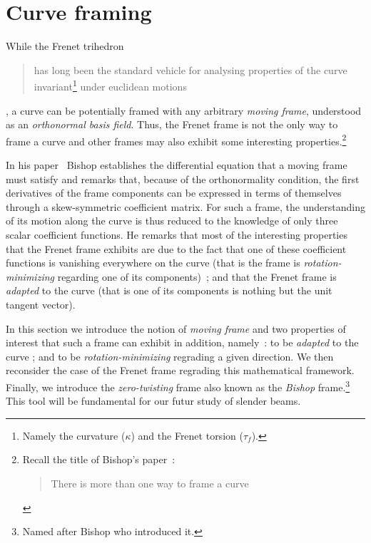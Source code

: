 
\section{Curve framing}\label{sec:curve_framing}


While the Frenet trihedron \blockcquote[p.1]{Bishop1975}{has long been the standard vehicle for analysing properties of the curve invariant\footnote{Namely the curvature ($\kappa$) and the Frenet torsion ($\tau_f$).} under euclidean motions}, a curve can be potentially framed with any arbitrary \emph{moving frame}, understood as an \emph{orthonormal basis field}. Thus, the Frenet frame is not the only way to frame a curve and other frames may also exhibit some interesting properties.\footnote{Recall the title of Bishop's paper~: \blockcquote[]{Bishop1975}{There is more than one way to frame a curve}.} 

In his paper~\cite{Bishop1975} Bishop establishes the differential equation that a moving frame must satisfy and remarks that, because of the orthonormality condition, the first derivatives of the frame components can be expressed in terms of themselves through a skew-symmetric coefficient matrix. For such a frame, the understanding of its motion along the curve is thus reduced to the knowledge of only three scalar coefficient functions. He remarks that most of the interesting properties that the Frenet frame exhibits are due to the fact that one of these coefficient functions is vanishing everywhere on the curve (that is the frame is \emph{rotation-minimizing} regarding one of its components)~; and that the Frenet frame is \emph{adapted} to the curve (that is one of its components is nothing but the unit tangent vector).

In this section we introduce the notion of \emph{moving frame} and two properties of interest that such a frame can exhibit in addition, namely~: to be \emph{adapted} to the curve ; and to be \emph{rotation-minimizing} regrading a given direction. We then reconsider the case of the Frenet frame regrading this mathematical framework. Finally, we introduce the \emph{zero-twisting} frame also known as the \emph{Bishop} frame.\footnote{Named after Bishop who introduced it.} This tool will be fundamental for our futur study of slender beams.

